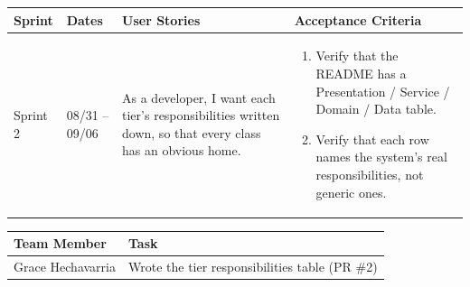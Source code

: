 \documentclass[12pt]{article}
\begin{document}
\noindent\begin{minipage}{\linewidth}

\vspace{0.5em}
\noindent
\begin{tabular}{|L{1.2cm}|L{1.8cm}|L{5.2cm}|L{6.3cm}|}
\hline
\textbf{Sprint} & \textbf{Dates} & \textbf{User Stories} & \textbf{Acceptance Criteria} \\
\hline
Sprint 2 & 08/31 -- 09/06 &
As a developer, I want each tier's responsibilities written down, so that every class has an obvious home. &
\begin{enumerate}
    \item Verify that the README has a Presentation / Service / Domain / Data table.
    \item Verify that each row names the system's real responsibilities, not generic ones.
\end{enumerate} \\
\hline
\end{tabular}

\vspace{0.5em}
\noindent
\begin{tabular}{|L{3.4cm}|L{11.6cm}|}
\hline
\textbf{Team Member} & \textbf{Task} \\
\hline
Grace Hechavarria & Wrote the tier responsibilities table (PR \#2) \\
\hline
\end{tabular}
\end{minipage}

\vspace{1.5em}
\end{document}

